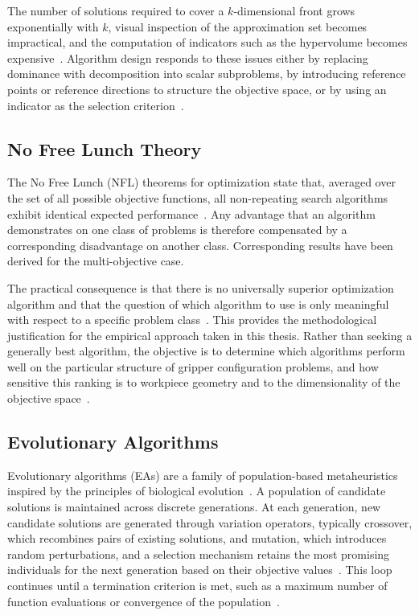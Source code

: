 The number of solutions required to cover a $k$-dimensional front grows exponentially with $k$, visual inspection of the approximation set becomes
impractical, and the computation of indicators such as the hypervolume becomes expensive~\cite{Guerreiro2020}. Algorithm design responds to these
issues either by replacing dominance with decomposition into scalar subproblems, by introducing reference points or reference directions to structure
the objective space, or by using an indicator as the selection criterion~\cite{Li2015Many-Objective,das_dennis}.

\subsection{No Free Lunch Theory}
\label{subsubsec:no_free_lunch}

The No Free Lunch (NFL) theorems for optimization state that, averaged over the set of all possible objective functions, all non-repeating search
algorithms exhibit identical expected performance~\cite{Adam2019No, Wolpert1997No}. Any advantage that an algorithm demonstrates on one class of
problems is therefore compensated by a corresponding disadvantage on another class. Corresponding results have been derived for the multi-objective
case.~\cite{Wolpert1997No, Haftka2016Requirements}

The practical consequence is that there is no universally superior optimization algorithm and that the question of which algorithm to use is only
meaningful with respect to a specific problem class~\cite{Cotta1998A}. This provides the methodological justification for the empirical approach taken
in this thesis. Rather than seeking a generally best algorithm, the objective is to determine which algorithms perform well on the particular
structure of gripper configuration problems, and how sensitive this ranking is to workpiece geometry and to the dimensionality of the objective space~\cite{Doerterler2021Analyzing}.

\subsection{Evolutionary Algorithms}
\label{subsubsec:evolutionary_algorithms}

Evolutionary algorithms (EAs) are a family of population-based metaheuristics inspired by the principles of biological evolution~\cite{Cheng2018Modelbased}. A population of
candidate solutions is maintained across discrete generations. At each generation, new candidate solutions are generated through variation operators,
typically crossover, which recombines pairs of existing solutions, and mutation, which introduces random perturbations, and a selection mechanism
retains the most promising individuals for the next generation based on their objective values~\cite{Slowik2020Evolutionary}. This loop continues until a termination criterion is
met, such as a maximum number of function evaluations or convergence of the population~\cite{Abulail2025Enhanced}.

